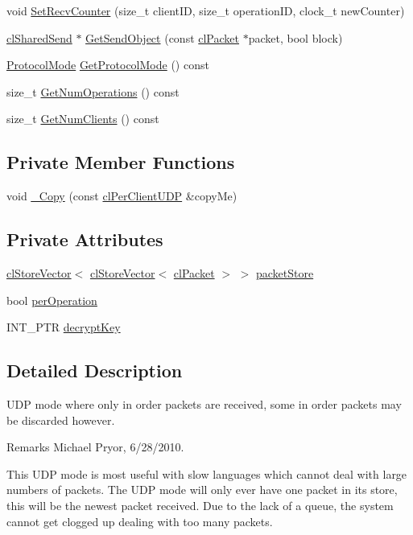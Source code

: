 \begin{DoxyCompactItemize}
\item 
void \hyperlink{classcl_per_client_u_d_p_a97cce2497fa9687fa5854f2c0a3fc684}{SetRecvCounter} (size\_\-t clientID, size\_\-t operationID, clock\_\-t newCounter)
\item 
\hyperlink{classcl_shared_send}{clSharedSend} $\ast$ \hyperlink{classcl_per_client_u_d_p_a33f25535cfef99e9abe9b2556928f364}{GetSendObject} (const \hyperlink{classcl_packet}{clPacket} $\ast$packet, bool block)
\item 
\hyperlink{classcl_shared_protocol_a4b0b9c82b8ae4eee78c6308c35afd47b}{ProtocolMode} \hyperlink{classcl_per_client_u_d_p_aa0f2be71b5dac611c2a6c6fd8b17c00a}{GetProtocolMode} () const 
\item 
size\_\-t \hyperlink{classcl_per_client_u_d_p_a3bfc57d56a06ce0a719d7c699029861b}{GetNumOperations} () const 
\item 
size\_\-t \hyperlink{classcl_per_client_u_d_p_a273adfddaf1db4ff56d6a17b10aa7674}{GetNumClients} () const 
\end{DoxyCompactItemize}
\subsection*{Private Member Functions}
\begin{DoxyCompactItemize}
\item 
void \hyperlink{classcl_per_client_u_d_p_a120350a3fece7004e731d883e1387426}{\_\-Copy} (const \hyperlink{classcl_per_client_u_d_p}{clPerClientUDP} \&copyMe)
\end{DoxyCompactItemize}
\subsection*{Private Attributes}
\begin{DoxyCompactItemize}
\item 
\hyperlink{classcl_store_vector}{clStoreVector}$<$ \hyperlink{classcl_store_vector}{clStoreVector}$<$ \hyperlink{classcl_packet}{clPacket} $>$ $>$ \hyperlink{classcl_per_client_u_d_p_a7ed46a6713cec6ebc3c788d7542bdc58}{packetStore}
\item 
bool \hyperlink{classcl_per_client_u_d_p_ae270ad0657e279032f9e1bebee3f0698}{perOperation}
\item 
INT\_\-PTR \hyperlink{classcl_per_client_u_d_p_a997243e373a1d997f27b111d06cccd90}{decryptKey}
\end{DoxyCompactItemize}


\subsection{Detailed Description}
UDP mode where only in order packets are received, some in order packets may be discarded however. \begin{DoxyRemark}{Remarks}
Michael Pryor, 6/28/2010.
\end{DoxyRemark}
This UDP mode is most useful with slow languages which cannot deal with large numbers of packets. The UDP mode will only ever have one packet in its store, this will be the newest packet received. Due to the lack of a queue, the system cannot get clogged up dealing with too many packets.

